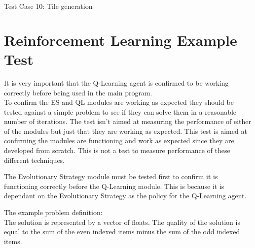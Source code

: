 \documentclass{report}
\begin{document}
\begin{center}
Test Case 10: Tile generation\\
\end{center}

\section{Reinforcement Learning Example Test}
It is very important that the Q-Learning agent is confirmed to be working correctly before being used in the main program.\\
To confirm the ES and QL modules are working as expected they should be tested against a simple problem to see if they can solve them in a reasonable number of iterations.
The test isn't aimed at measuring the performance of either of the modules but just that they are working as expected.
This test is aimed at confirming the modules are functioning and work as expected since they are developed from scratch. This is not a test to measure performance of these different techniques.

The Evolutionary Strategy module must be tested first to confirm it is functioning correctly before the Q-Learning module. This is because it is dependant on the Evolutionary Strategy
as the policy for the Q-Learning agent.

The example problem definition:\\
The solution is represented by a vector of floats. The quality of the solution is equal to the sum of the even indexed items minus the sum of the odd indexed items.
\end{document}
